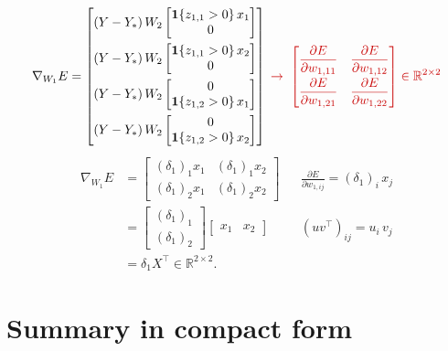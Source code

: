 \documentclass[11pt,a4paper]{article}
\newcommand{\R}{\mathbb{R}}
\newcommand{\ind}{\mathbf{1}}
\newcommand{\C}[1]{{\color{chg}#1}}          %
\begin{document}
\[
\nabla_{W_1}E=\begin{bmatrix}
(Y-Y_*)\,W_2\begin{bmatrix}\ind\{z_{1,1}>0\}\,x_1\\0\end{bmatrix}\\[10pt]
(Y-Y_*)\,W_2\begin{bmatrix}\ind\{z_{1,1}>0\}\,x_2\\0\end{bmatrix}\\[10pt]
(Y-Y_*)\,W_2\begin{bmatrix}0\\\ind\{z_{1,2}>0\}\,x_1\end{bmatrix}\\[10pt]
(Y-Y_*)\,W_2\begin{bmatrix}0\\\ind\{z_{1,2}>0\}\,x_2\end{bmatrix}
\end{bmatrix}
\;\C{\to\;\begin{bmatrix}\dfrac{\partial E}{\partial w_{1,11}}&\dfrac{\partial E}{\partial w_{1,12}}\\[8pt]
                 \dfrac{\partial E}{\partial w_{1,21}}&\dfrac{\partial E}{\partial w_{1,22}}\end{bmatrix}\in\R^{2\times2}}
\]
{\color{chg}
\begin{align*}
\nabla_{W_1}E
&=\begin{bmatrix}(\delta_1)_1x_1&(\delta_1)_1x_2\\(\delta_1)_2x_1&(\delta_1)_2x_2\end{bmatrix}
&&\frac{\partial E}{\partial w_{1,ij}}=(\delta_1)_i\,x_j\\
&=\begin{bmatrix}(\delta_1)_1\\(\delta_1)_2\end{bmatrix}\begin{bmatrix}x_1&x_2\end{bmatrix}
&&(uv^{\top})_{ij}=u_i\,v_j\\
&=\delta_1X^{\top}\in\R^{2\times2}.
&&
\end{align*}
}

\section{\C{Summary in compact form}}
\end{document}
